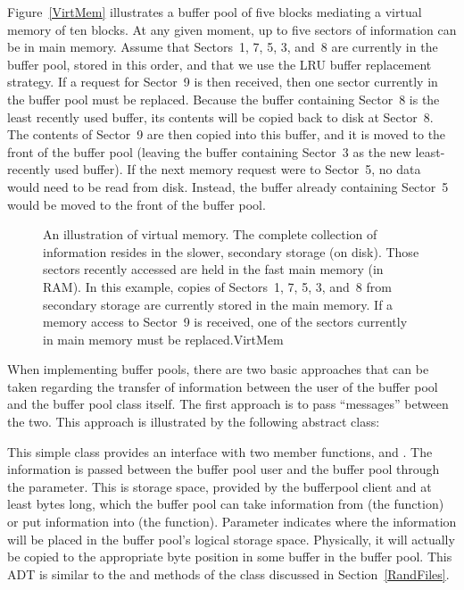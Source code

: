 \begin{example}
Figure~\ref{VirtMem} illustrates a buffer pool of five blocks 
mediating a virtual memory of ten blocks.
At any given moment, up to five sectors of information can be in main
memory.
Assume that Sectors~1, 7, 5, 3, and~8 are currently in the buffer pool,
stored in this order, and that we use the LRU buffer replacement
strategy.
If a request for Sector~9 is then received, then one sector currently
in the buffer pool must be replaced.
Because the buffer containing Sector~8 is the least recently used
buffer, its contents will be copied back to disk at Sector~8.
The contents of Sector~9 are then copied into this buffer, and it is
moved to the front of the buffer pool (leaving the buffer containing
Sector~3 as the new least-recently used buffer).
If the next memory request were to Sector~5, no data would need to be
read from disk.
Instead, the buffer already containing Sector~5 would be moved to the
front of the buffer pool.
\end{example}

\begin{figure}
\vspace{-\medskipamount}

{An illustration of virtual memory.
The complete collection of information resides in the slower, secondary
storage (on disk).
Those sectors recently accessed are held in the fast main memory
(in RAM).
In this example, copies of Sectors~1, 7, 5, 3, and~8 from
secondary storage are currently stored in the main memory.
If a memory access to Sector~9 is received, one of the sectors
currently in main memory must be replaced.}{VirtMem}
\bigskip\medskip
\end{figure}

When implementing buffer pools, there are two basic approaches that can 
be taken regarding the transfer of information between the user of the 
buffer pool and the buffer pool class itself.
The first approach is to pass ``messages'' between the two.
This approach is illustrated by the following abstract class:


This simple class provides an interface with two member functions,
 and .
The information is passed between the buffer pool user and the
buffer pool through the  parameter.
This is storage space, provided by the bufferpool client and at least
 bytes long, which the 
buffer pool can take information from (the  function) or
put information into (the  function).
Parameter  indicates where the information will be placed
in the buffer pool's logical storage space.
Physically, it will actually be copied to the appropriate byte
position in some buffer in the buffer pool.
This ADT is similar to the  and  methods of the
 class discussed in Section~\ref{RandFiles}.

